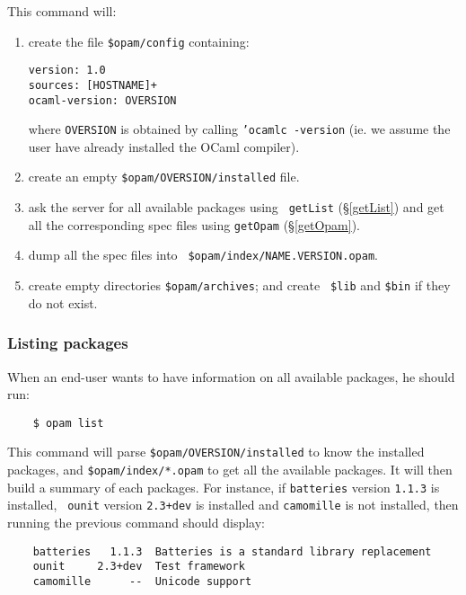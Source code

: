 \documentclass[a4paper,11pt]{article}
\begin{document}
\begin{itemize}
This command will:

\begin{enumerate}

\item create the file {\tt \$opam/config} containing:

\begin{verbatim}
version: 1.0
sources: [HOSTNAME]+
ocaml-version: OVERSION
\end{verbatim}

where {\tt OVERSION} is obtained by calling {\tt 'ocamlc -version}
(ie. we assume the user have already installed the OCaml compiler).

\item create an empty {\tt \$opam/OVERSION/installed} file.

\item ask the server for all available packages using {\tt
  getList} (\S\ref{getList}) and get all the corresponding spec files
  using {\tt getOpam} (\S\ref{getOpam}).

\item dump all the spec files into {\tt
  \$opam/index/NAME.VERSION.opam}.

\item create empty directories {\tt \$opam/archives}; and create {\tt
  \$lib} and {\tt \$bin} if they do not exist.

\end{enumerate}

\subsubsection{Listing packages}

When an end-user wants to have information on all available packages,
he should run:

\begin{verbatim}
    $ opam list
\end{verbatim}

This command will parse {\tt \$opam/OVERSION/installed} to know the
installed packages, and {\tt \$opam/index/*.opam} to get all the
available packages. It will then build a summary of each packages. For
instance, if {\tt batteries} version {\tt 1.1.3} is installed, {\tt
  ounit} version {\tt 2.3+dev} is installed and {\tt camomille} is not
installed, then running the previous command should display:

\begin{verbatim}
    batteries   1.1.3  Batteries is a standard library replacement
    ounit     2.3+dev  Test framework
    camomille      --  Unicode support
\end{verbatim}



\end{itemize}
\end{document}
